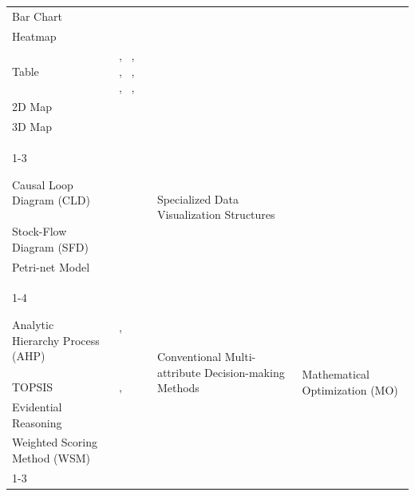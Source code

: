 \documentclass{sfuthesis}
\begin{document}
\begin{appendices}
\begin{landscape}
\begin{longtable}{
p{5.5cm}
p{4cm}
p{6cm}
p{3.5cm}
}
Bar Chart &
~\cite{RiosZertuche2020ElectronicDecisionSupport} &
&
\\

Heatmap &
~\cite{muller2021risk} &
&
\\

Table &
~\cite{Yang2010MacroeconomicDSS}, ~\cite{RiosZertuche2020ElectronicDecisionSupport}, ~\cite{valdes2017clinical}, ~\cite{muller2021risk}, ~\cite{Tarnowska2022TinnitusTherapy}, ~\cite{Han2020WastewaterDecisionMaking}, ~\cite{ataei2024intelligent} &
&
\\

2D Map &
~\cite{Sonehara2019CyberPhysicalSociety} &
&
\\

3D Map &
~\cite{Ma2020EquipmentMaintenance} &
&
\\
\cline{1-3}

Causal Loop Diagram (CLD) &
~\cite{Hu2023MegaInfrastructure} &
\multirow{3}{6cm}{Specialized Data Visualization Structures}
&
\\

Stock-Flow Diagram (SFD) &
~\cite{Hu2023MegaInfrastructure} &
&
\\

Petri-net Model &
~\cite{ataei2024intelligent} &
&
\\
\cline{1-4}

Analytic Hierarchy Process (AHP) &
~\cite{Zhu2018EducationalDSS}, ~\cite{DelaCal2026CulturalTourism} &
\multirow{4}{6cm}{Conventional Multi-attribute Decision-making Methods}
&
\multirow{11}{3.5cm}{Mathematical Optimization (MO)}
\\

TOPSIS &
~\cite{Li2023UnbalancedBidding}, ~\cite{gaftandzhieva2023data} &
&
\\

Evidential Reasoning &
~\cite{fu2020data} &
&
\\

Weighted Scoring Method (WSM) &
~\cite{Yu2020FactorySimulation} &
&
\\
\cline{1-3}


\end{longtable}
\end{landscape}
\end{appendices}
\end{document}
